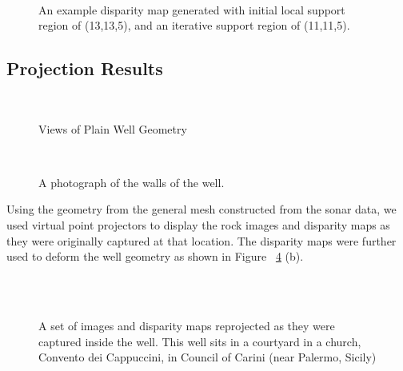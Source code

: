 \documentclass[a4paper,twoside]{article}
\begin{document}
\begin{figure}[!h]
	\centering
		\quad %
		\\%
		\medskip
		\caption{An example disparity map generated with initial local support region of (13,13,5), and an iterative support region of (11,11,5).}
		\label{fig:disparity}
\end{figure}

\subsection{Projection Results}


\begin{figure}[!h]
	\centering
		\quad %
		\\%

		\caption{Views of Plain Well Geometry}
		\label{fig:wellNoFine}
\end{figure}


\begin{figure}[!h]
	\centering
		\\%

		\caption{ A photograph of the walls of the well.}
		\label{fig:wellPhoto}
\end{figure}

Using the geometry from the general mesh constructed from the sonar data, we used virtual point projectors to display the rock images and disparity maps as they were originally captured at that location.  
The disparity maps were further used to deform the well geometry as shown in Figure ~\ref{fig:result2} (b).

\begin{figure}[!h]
	\centering
		\\
		\quad %
			\\		
	
		\caption{A set of images and disparity maps reprojected as they were captured inside the well. This well sits in a courtyard in a church, Convento dei Cappuccini, in Council of Carini (near Palermo, Sicily)}
		\label{fig:result2}
\end{figure}
\end{document}
